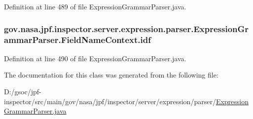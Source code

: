 Definition at line 489 of file Expression\+Grammar\+Parser.\+java.

\subsubsection[{\texorpdfstring{idf}{idf}}]{ gov.\+nasa.\+jpf.\+inspector.\+server.\+expression.\+parser.\+Expression\+Grammar\+Parser.\+Field\+Name\+Context.\+idf}\hypertarget{classgov_1_1nasa_1_1jpf_1_1inspector_1_1server_1_1expression_1_1parser_1_1_expression_grammar_parser_1_1_field_name_context_aea8caf78d6c50ce4bb13d90d6d9c92a1}{}\label{classgov_1_1nasa_1_1jpf_1_1inspector_1_1server_1_1expression_1_1parser_1_1_expression_grammar_parser_1_1_field_name_context_aea8caf78d6c50ce4bb13d90d6d9c92a1}


Definition at line 490 of file Expression\+Grammar\+Parser.\+java.



The documentation for this class was generated from the following file\+:\begin{DoxyCompactItemize}
\item 
D\+:/gsoc/jpf-\/inspector/src/main/gov/nasa/jpf/inspector/server/expression/parser/\hyperlink{_expression_grammar_parser_8java}{Expression\+Grammar\+Parser.\+java}\end{DoxyCompactItemize}
